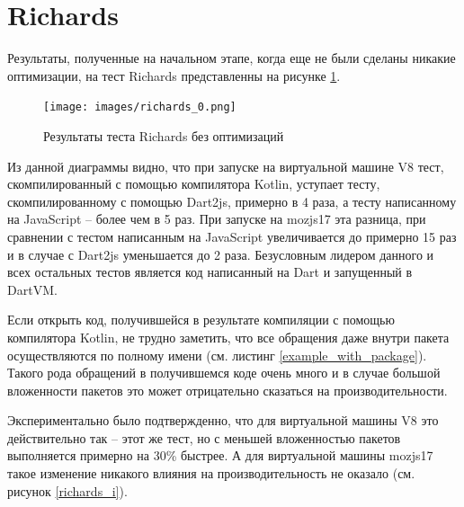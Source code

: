 \section{Richards}

Результаты, полученные на начальном этапе, когда еще не были сделаны никакие оптимизации, на тест Richards представленны на рисунке \ref{richards_0}.

\begin{figure}[ht!]
\centering
\texttt{[image: images/richards\_0.png]}
\caption{Результаты теста Richards без оптимизаций}
\label{richards_0}
\end{figure}

Из данной диаграммы видно, что при запуске на виртуальной машине V8 тест, скомпилированный с помощью компилятора Kotlin, уступает тесту, скомпилированному с помощью Dart2js, примерно в 4 раза, а тесту написанному на JavaScript -- более чем в 5 раз. При запуске на mozjs17 эта разница, при сравнении с тестом написанным на JavaScript увеличивается до примерно 15 раз и в случае с Dart2js уменьшается до 2 раза. Безусловным лидером данного и всех остальных тестов является код написанный на Dart и запущенный в DartVM.

Если открыть код, получившейся в результате компиляции с помощью компилятора Kotlin, не трудно заметить, что все обращения даже внутри пакета осуществляются по полному имени (см. листинг \ref{example_with_package}). Такого рода обращений в получившемся коде очень много и в случае большой вложенности пакетов это может отрицательно сказаться на производительности. 

\begin{code}
\begin{JavaScript}[caption=Пример код с обращением по полному имени внутри того же пакета, label=example_with_package]
...
_ = {
org: Kotlin.definePackage({
  jetbrains: Kotlin.definePackage({
    kotlin: Kotlin.definePackage({
      benchmarks: Kotlin.definePackage({
        Richards_from_darts: Kotlin.definePackage({
          js: Kotlin.definePackage({
            //...
            addIdleTask: function (id, priority, queue, count) {
            this.addRunningTask(id, priority, queue, new _.org.jetbrains.kotlin.benchmarks.Richards.js.IdleTask(this, 1, count));
            }
            //...
\end{JavaScript}
\end{code}

Экспериментально было подтвержденно, что для виртуальной машины V8 это действительно так -- этот же тест, но с меньшей вложенностью пакетов выполняется примерно на 30\% быстрее. А для виртуальной машины mozjs17 такое изменение никакого влияния на производительность не оказало (см. рисунок \ref{richards_i}).

